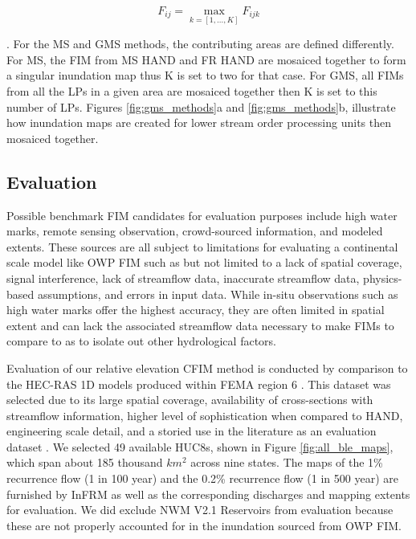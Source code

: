 \documentclass[draft]{dependencies/agujournal2019}
\begin{document}
%
\begin{linenomath*}
\begin{equation}
\label{eq:comp_fim}
    F_{ij} = \max_{k=[1,...,K]} F_{ijk}
\end{equation}
\end{linenomath*}
. For the MS and GMS methods, the contributing areas are defined differently.
For MS, the FIM from MS HAND and FR HAND are mosaiced together to form a singular inundation map thus K is set to two for that case.
For GMS, all FIMs from all the LPs in a given area are mosaiced together then K is set to this number of LPs.
Figures \ref{fig:gms_methods}a and \ref{fig:gms_methods}b, illustrate how inundation maps are created for lower stream order processing units then mosaiced together.
%
\subsection{Evaluation}
\label{ssec:evaluation}
%
Possible benchmark FIM candidates for evaluation purposes include high water marks, remote sensing observation, crowd-sourced information, and modeled extents.
These sources are all subject to limitations for evaluating a continental scale model like OWP FIM such as but not limited to a lack of spatial coverage, signal interference, lack of streamflow data, inaccurate streamflow data, physics-based assumptions, and errors in input data.
While in-situ observations such as high water marks offer the highest accuracy, they are often limited in spatial extent and can lack the associated streamflow data necessary to make FIMs to compare to as to isolate out other hydrological factors.

Evaluation of our relative elevation CFIM method is conducted by comparison to the HEC-RAS 1D models produced within FEMA region 6 \cite{fema2021base,fema2021estimated,us2022hydrologic}.
This dataset was selected due to its large spatial coverage, availability of cross-sections with streamflow information, higher level of sophistication when compared to HAND, engineering scale detail, and a storied use in the literature as an evaluation dataset \cite{cook2009effect,rajib2016large,zheng2018geoflood,afshari2018comparison,wing2017validation,criss2022stage,follum2017autorapid}.
We selected 49 available HUC8s, shown in Figure \ref{fig:all_ble_maps}, which span about 185 thousand $km^2$ across nine states.
The maps of the 1\% recurrence flow (1 in 100 year) and the 0.2\% recurrence flow (1 in 500 year) are furnished by InFRM as well as the corresponding discharges and mapping extents for evaluation.
We did exclude NWM V2.1 Reservoirs from evaluation because these are not properly accounted for in the inundation sourced from OWP FIM.
\end{document}
